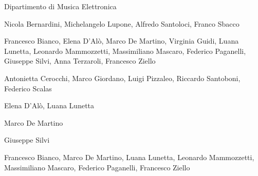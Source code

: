 

%
%
	
{\fontsize{24}{22} }

\medskip

{\fontsize{12}{12} \textsf{Dipartimento di Musica Elettronica}}

\vspace{.5cm}

\textbf{}

Nicola Bernardini, Michelangelo Lupone, Alfredo Santoloci, Franco Sbacco

\medskip

\textbf{}

Francesco Bianco, Elena D’Alò, Marco De Martino, Virginia Guidi, Luana Lunetta, Leonardo Mammozzetti, Massimiliano Mascaro, Federico Paganelli, Giuseppe Silvi, Anna Terzaroli, Francesco Ziello  

\medskip

\textbf{}

Antonietta Cerocchi, Marco Giordano, Luigi Pizzaleo, Riccardo Santoboni, Federico Scalas

\medskip

\textbf{}

Elena D’Alò, Luana Lunetta

\medskip

\textbf{}

Marco De Martino

\medskip

\textbf{}

Giuseppe Silvi

\medskip

\textbf{}

Francesco Bianco, Marco De Martino, Luana Lunetta, Leonardo Mammozzetti, Massimiliano Mascaro, Federico Paganelli, Francesco Ziello
%
%
%
%
%
%
%
%
%
%
%
%

